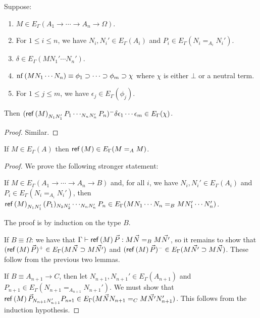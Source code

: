 \begin{lm}
Suppose:
\begin{enumerate}
\item
$M \in E_\Gamma(A_1 \rightarrow \cdots \rightarrow A_n \rightarrow \Omega)$.
\item
For $1 \leq i \leq n$, we have $N_i, N_i' \in E_\Gamma(A_i)$ and $P_i \in E_\Gamma(N_i =_{A_i} N_i')$.
\item
$\delta \in E_\Gamma(M N_1' \cdots N_n')$.
\item
$\mathrm{nf} \left( {M N_1 \cdots N_n} \right) \equiv \phi_1 \supset \cdots \supset \phi_m \supset \chi$ where $\chi$
is either $\bot$ or a neutral term.
\item
For $1 \leq j \leq m$, we have $\epsilon_j \in E_\Gamma(\phi_j)$.
\end{enumerate}
Then $(\mathsf{ref} \left( {M} \right)_{N_1 N_1'} P_1 \cdots_{N_n N_n'} P_n)^- \delta \epsilon_1 \cdots \epsilon_m \in E_\Gamma(\chi)$.
\end{lm}

\begin{proof}
Similar.
\end{proof}

\begin{lm}
\label{lm:Eref}
If $M \in E_\Gamma(A)$ then $\mathsf{ref} \left( {M} \right) \in E_\Gamma(M =_A M)$.
\end{lm}

\begin{proof}
We prove the following stronger statement:

If $M \in E_\Gamma(A_1 \rightarrow \cdots \rightarrow A_n \rightarrow B)$ and, for all $i$, we have
$N_i, N_i' \in E_\Gamma(A_i)$ and $P_i \in E_\Gamma(N_i =_{A_i} N_i')$, then $\mathsf{ref} \left( {M} \right)_{N_1 N_1'} (P_1)_{N_2 N_2'}
\cdots_{N_n N_n'} P_n \in E_\Gamma(M N_1 \cdots N_n =_B M N_1' \cdots N_n')$.

The proof is by induction on the type $B$.

If $B \equiv \Omega$: we have that $\Gamma \vdash \mathsf{ref} \left( {M} \right) \vec{P} : M \vec{N} =_B M \vec{N'}$, so it remains
to show that $(\mathsf{ref} \left( {M} \right) \vec{P})^+ \in E_\Gamma(M \vec{N} \supset M \vec{N'})$ and $(\mathsf{ref} \left( {M} \right) \vec{P})^- \in E_\Gamma(M \vec{N'} \supset
M \vec{N})$.  These follow from the previous two lemmas.

If $B \equiv A_{n+1} \rightarrow C$, then let $N_{n+1}, N_{n+1}' \in E_\Gamma(A_{n+1})$ and \\
$P_{n+1} \in E_\Gamma(N_{n+1} =_{A_{n+1}} N_{n+1}')$.  We must show that
$\mathsf{ref} \left( {M} \right) \vec{P}_{N_{n+1} N_{n+1}'} P_{n*1} \in E_\Gamma(M \vec{N} N_{n+1} =_C M \vec{N'} N_{n+1}')$.  This follows
from the induction hypothesis.
\end{proof}

